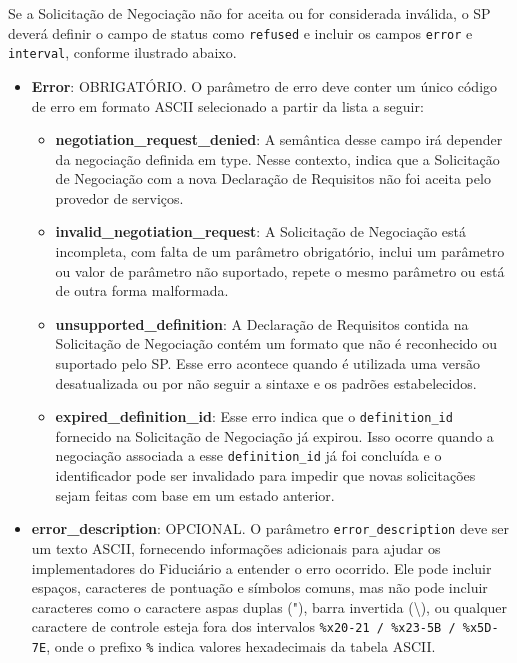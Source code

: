 Se a Solicitação de Negociação não for aceita ou for considerada inválida, o SP deverá definir o campo de status como \texttt{refused} e incluir os campos \texttt{error} e \texttt{interval}, conforme ilustrado abaixo.



\begin{itemize}

    \item \textbf{Error}: OBRIGATÓRIO. O parâmetro de erro deve conter um único código de erro em formato ASCII selecionado a partir da lista a seguir:

    \begin{itemize}
    
        \item \textbf{negotiation\_request\_denied}: A semântica desse campo irá depender da negociação definida em type. Nesse contexto, indica que a Solicitação de Negociação com a nova Declaração de Requisitos não foi aceita pelo provedor de serviços.

        \item \textbf{invalid\_negotiation\_request}: A Solicitação de Negociação está incompleta, com falta de um parâmetro obrigatório, inclui um parâmetro ou valor de parâmetro não suportado, repete o mesmo parâmetro ou está de outra forma malformada.

        \item \textbf{unsupported\_definition}: A Declaração de Requisitos contida na Solicitação de Negociação contém um formato que não é reconhecido ou suportado pelo \acs{SP}. Esse erro acontece quando é utilizada uma versão desatualizada ou por não seguir a sintaxe e os padrões estabelecidos.

        \item \textbf{expired\_definition\_id}: Esse erro indica que o \texttt{definition\_id} fornecido na Solicitação de Negociação já expirou. Isso ocorre quando a negociação associada a esse \texttt{definition\_id} já foi concluída e o identificador pode ser invalidado para impedir que novas solicitações sejam feitas com base em um estado anterior.
        
    \end{itemize}

    \item \textbf{error\_description}: OPCIONAL. O parâmetro \texttt{error\_description} deve ser um texto ASCII, fornecendo informações adicionais para ajudar os implementadores do Fiduciário a entender o erro ocorrido. Ele pode incluir espaços, caracteres de pontuação e símbolos comuns, mas não pode incluir caracteres como o caractere aspas duplas ("), barra invertida (\textbackslash), ou qualquer caractere de controle esteja fora dos intervalos \texttt{\%x20-21 / \%x23-5B / \%x5D-7E}, onde o prefixo \texttt{\%} indica valores hexadecimais da tabela ASCII.


\end{itemize}

